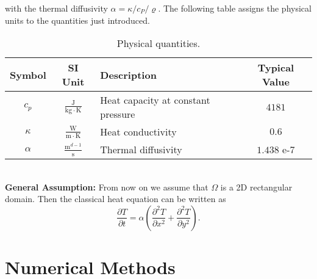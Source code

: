 \documentclass[a4paper,11pt]{article}
\begin{document}
with the thermal diffusivity $\alpha = \kappa / c_P / \varrho $. The following table assigns the physical units to the quantities just introduced.
\begin{table}[h!] 
\centering
{ \renewcommand{\arraystretch}{1.4}
\begin{tabular}{cclc}
\toprule
\textbf{Symbol} & \textbf{SI Unit} & \textbf{Description}& \textbf{Typical Value}\\
\midrule
$c_p$ & $\tfrac{\mathrm{J}}{\mathrm{kg}\cdot\mathrm{K} }$ & Heat capacity at constant pressure &  $ 4181 $\\
$\kappa $ & $\tfrac{\mathrm{W}}{\mathrm{m}\cdot\mathrm{K} }$ & Heat conductivity & $ 0.6 $\\
$\alpha $ & $\tfrac{\mathrm{m}^{d-1}}{\mathrm{s} }$ &  Thermal diffusivity & $ 1.438$ e-$7 $\\
\bottomrule
\end{tabular}}
\caption{Physical quantities.}
\label{TableTypicalValues}
\end{table}
\\
\textbf{General Assumption:} From now on we assume that $\Omega $ is a  2D rectangular domain. Then the classical heat equation can be written as
\begin{equation} \label{HeatEquation2D}
\frac{\partial T}{\partial t} = \alpha \left( \frac{\partial^2 T}{\partial x^2} + \frac{\partial^2 T}{\partial y^2} \right) .
\end{equation}
\section{Numerical Methods}
\end{document}
